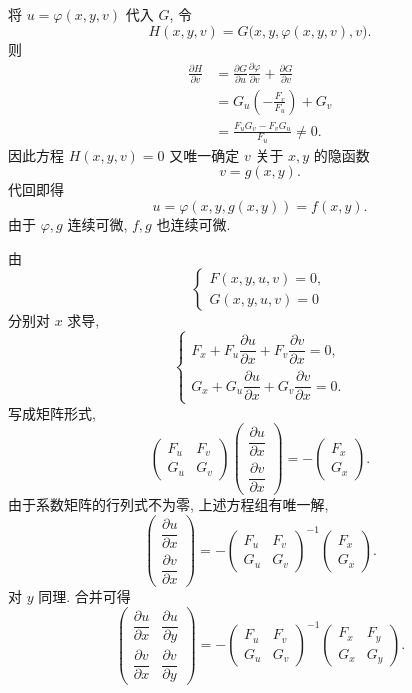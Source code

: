 	将 $u=\varphi(x,y,v)$ 代入 $G$, 令
	\[
	H(x,y,v)
	=
	G\bigl(x,y,\varphi(x,y,v),v\bigr).
	\]
	则
	\[
	\begin{aligned}
	\frac{\partial H}{\partial v}
	&=
	\frac{\partial G}{\partial u}
	\frac{\partial\varphi}{\partial v}
	+\frac{\partial G}{\partial v}\\
	&=
	G_u\left(-\frac{F_v}{F_u}\right)+G_v\\
	&=
	\frac{F_uG_v-F_vG_u}{F_u}
	\ne0.
	\end{aligned}
	\]
	因此方程 $H(x,y,v)=0$ 又唯一确定 $v$ 关于 $x,y$ 的隐函数
	\[
	v=g(x,y).
	\]
	代回即得
	\[
	u=\varphi(x,y,g(x,y))=f(x,y).
	\]
	由于 $\varphi,g$ 连续可微, $f,g$ 也连续可微.

	由
	\[
	\begin{cases}
	F(x,y,u,v)=0,\\
	G(x,y,u,v)=0
	\end{cases}
	\]
	分别对 $x$ 求导,
	\[
	\begin{cases}
	F_x+F_u\dfrac{\partial u}{\partial x}
	+F_v\dfrac{\partial v}{\partial x}=0,\\[6pt]
	G_x+G_u\dfrac{\partial u}{\partial x}
	+G_v\dfrac{\partial v}{\partial x}=0.
	\end{cases}
	\]
	写成矩阵形式,
	\[
	\begin{pmatrix}
	F_u&F_v\\
	G_u&G_v
	\end{pmatrix}
	\begin{pmatrix}
	\dfrac{\partial u}{\partial x}\\[5pt]
	\dfrac{\partial v}{\partial x}
	\end{pmatrix}
	=
	-
	\begin{pmatrix}
	F_x\\
	G_x
	\end{pmatrix}.
	\]
	由于系数矩阵的行列式不为零, 上述方程组有唯一解,
	\[
	\begin{pmatrix}
	\dfrac{\partial u}{\partial x}\\[5pt]
	\dfrac{\partial v}{\partial x}
	\end{pmatrix}
	=
	-
	\begin{pmatrix}
	F_u&F_v\\
	G_u&G_v
	\end{pmatrix}^{-1}
	\begin{pmatrix}
	F_x\\
	G_x
	\end{pmatrix}.
	\]
	对 $y$ 同理. 合并可得
	\[
	\begin{pmatrix}
	\dfrac{\partial u}{\partial x}&
	\dfrac{\partial u}{\partial y}\\[6pt]
	\dfrac{\partial v}{\partial x}&
	\dfrac{\partial v}{\partial y}
	\end{pmatrix}
	=
	-
	\begin{pmatrix}
	F_u&F_v\\
	G_u&G_v
	\end{pmatrix}^{-1}
	\begin{pmatrix}
	F_x&F_y\\
	G_x&G_y
	\end{pmatrix}.
	\]



